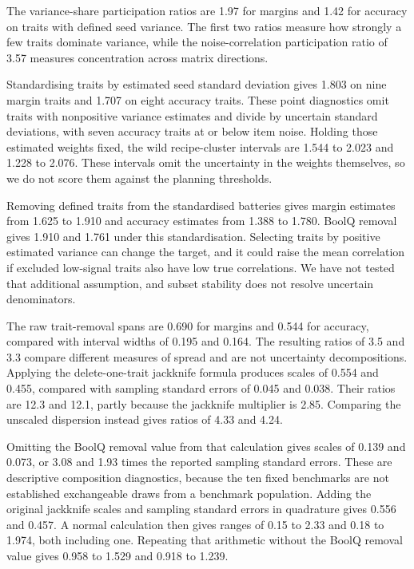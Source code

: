 The variance-share participation ratios are 1.97 for margins and 1.42 for accuracy on traits with defined seed variance. The first two ratios measure how strongly a few traits dominate variance, while the noise-correlation participation ratio of 3.57 measures concentration across matrix directions.

Standardising traits by estimated seed standard deviation gives 1.803 on nine margin traits and 1.707 on eight accuracy traits. These point diagnostics omit traits with nonpositive variance estimates and divide by uncertain standard deviations, with seven accuracy traits at or below item noise. Holding those estimated weights fixed, the wild recipe-cluster intervals are 1.544 to 2.023 and 1.228 to 2.076. These intervals omit the uncertainty in the weights themselves, so we do not score them against the planning thresholds.

Removing defined traits from the standardised batteries gives margin estimates from 1.625 to 1.910 and accuracy estimates from 1.388 to 1.780. BoolQ removal gives 1.910 and 1.761 under this standardisation. Selecting traits by positive estimated variance can change the target, and it could raise the mean correlation if excluded low-signal traits also have low true correlations. We have not tested that additional assumption, and subset stability does not resolve uncertain denominators.

The raw trait-removal spans are 0.690 for margins and 0.544 for accuracy, compared with interval widths of 0.195 and 0.164. The resulting ratios of 3.5 and 3.3 compare different measures of spread and are not uncertainty decompositions. Applying the delete-one-trait jackknife formula produces scales of 0.554 and 0.455, compared with sampling standard errors of 0.045 and 0.038. Their ratios are 12.3 and 12.1, partly because the jackknife multiplier is 2.85. Comparing the unscaled dispersion instead gives ratios of 4.33 and 4.24.

Omitting the BoolQ removal value from that calculation gives scales of 0.139 and 0.073, or 3.08 and 1.93 times the reported sampling standard errors. These are descriptive composition diagnostics, because the ten fixed benchmarks are not established exchangeable draws from a benchmark population. Adding the original jackknife scales and sampling standard errors in quadrature gives 0.556 and 0.457. A normal calculation then gives ranges of 0.15 to 2.33 and 0.18 to 1.974, both including one. Repeating that arithmetic without the BoolQ removal value gives 0.958 to 1.529 and 0.918 to 1.239.


